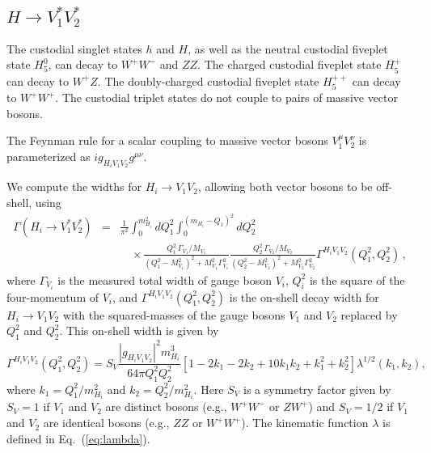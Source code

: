 \documentclass[11pt]{article}
\begin{document}
\subsection{$H \to V_1^* V_2^*$}

The custodial singlet states $h$ and $H$, as well as the neutral custodial fiveplet state $H_5^0$, can decay to $W^+W^-$ and $ZZ$.  The charged custodial fiveplet state $H_5^+$ can decay to $W^+Z$.  The doubly-charged custodial fiveplet state $H_5^{++}$ can decay to $W^+W^+$.  The custodial triplet states do not couple to pairs of massive vector bosons.

The Feynman rule for a scalar coupling to massive vector bosons $V_1^{\mu} V_2^{\nu}$ is parameterized as $i g_{H_iV_1V_2} g^{\mu\nu}$.

We compute the widths for $H_i \to V_1 V_2$, allowing both vector bosons to be off-shell, using~\cite{Romao:1998sr,Contino:2014aaa}
\begin{eqnarray}
	\Gamma(H_i\rightarrow V_1^*V_2^*) &=& \frac{1}{\pi^2}\int_0^{m_{H_i}^2} dQ_1^2 
	\int_0^{(m_{H_i} - Q_1)^2} dQ_2^2 \nonumber \\
	&& \quad \times
	\frac{Q_1^2 \, \Gamma_{V_1} / M_{V_1}}{(Q_1^2-M_{V_1}^2)^2+M_{V_1}^2\Gamma_{V_1}^2} 
	\frac{Q_2^2 \, \Gamma_{V_2}/M_{V_2}}{(Q_2^2-M_{V_2}^2)^2+M_{V_2}^2\Gamma_{V_2}^2}
	\Gamma^{H_iV_1V_2}(Q_1^2,Q_2^2)\,,
	\label{eq:V*V*int}
\end{eqnarray}
where $\Gamma_{V_i}$ is the measured total width of gauge boson $V_i$, $Q_i^2$ is the square of the four-momentum of $V_i$, and $\Gamma^{H_iV_1V_2}(Q_1^2,Q_2^2)$ is the on-shell decay width for $H_i\rightarrow V_1 V_2$ with the squared-masses of the gauge bosons $V_1$ and $V_2$ replaced by $Q_1^2$ and $Q_2^2$.  This on-shell width is given by
\begin{equation}
	\Gamma^{H_i V_1 V_2} (Q_1^2, Q_2^2)
	= S_V \frac{|g_{H_iV_1V_2}|^2 m_{H_i}^3}{64 \pi Q_1^2 Q_2^2}
	\left[ 1 - 2 k_1 - 2 k_2 + 10 k_1 k_2 + k_1^2 + k_2^2 \right]
	\lambda^{1/2}(k_1, k_2),
\end{equation}
where $k_1 = Q_1^2/m_{H_i}^2$ and $k_2 = Q_2^2/m_{H_i}^2$. Here $S_V$ is a symmetry factor given by $S_V = 1$ if $V_1$ and $V_2$ are distinct bosons (e.g., $W^+W^-$ or $Z W^+$) and $S_V = 1/2$ if $V_1$ and $V_2$ are identical bosons (e.g., $ZZ$ or $W^+W^+$).  The kinematic function $\lambda$ is defined in Eq.~(\ref{eq:lambda}).
\end{document}
